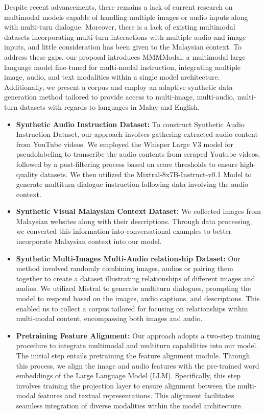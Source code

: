 \documentclass[preprint]{article}
\begin{document}
Despite recent advancements, there remains a lack of current research on multimodal models capable of handling multiple images or audio inputs along with multi-turn dialogue. Moreover, there is a lack of existing multimodal datasets incorporating multi-turn interactions with multiple audio and image inputs, and little consideration has been given to the Malaysian context. To address these gaps, our proposal introduces MMMModal, a multimodal large language model fine-tuned for multi-modal instruction, integrating multiple image, audio, and text modalities within a single model architecture. Additionally, we present a corpus and employ an adaptive synthetic data generation method tailored to provide access to multi-image, multi-audio, multi-turn datasets with regards to languages in Malay and English.

\begin{itemize}

  \item \textbf{Synthetic Audio Instruction Dataset:} To construct Synthetic Audio Instruction Dataset, our approach involves gathering extracted audio content from YouTube videos. We  employed the Whisper Large V3 model for pseudolabeling to transcribe the audio contents from scraped Youtube videos, followed by a post-filtering process based on score thresholds to ensure high-quality datasets. We then utilized the Mixtral-8x7B-Instruct-v0.1 Model to generate multiturn dialogue instruction-following data involving the audio context.

  \item \textbf{Synthetic Visual Malaysian Context Dataset:}  We collected images from Malaysian websites along with their descriptions. Through data processing, we converted this information into conversational examples to better incorporate Malaysian context into our model.

  \item \textbf{Synthetic Multi-Images Multi-Audio relationship Dataset:} Our method involved randomly combining images, audios or pairing them together to create a dataset illustrating relationships of different images and audios. We utilized Mistral to generate multiturn dialogues, prompting the model to respond based on the images, audio captions, and descriptions. This enabled us to collect a corpus tailored for focusing on relationships within multi-modal content, encompassing both images and audio.

  \item \textbf{Pretraining Feature Alignment:} Our approach adopts a two-step training procedure to integrate multimodal and multiturn capabilities into our model. The initial step entails pretraining the feature alignment module. Through this process, we align the image and audio features with the pre-trained word embeddings of the Large Language Model (LLM). Specifically, this step involves training the projection layer to ensure alignment between the multi-modal features and textual representations. This alignment facilitates seamless integration of diverse modalities within the model architecture.


\end{itemize}
\end{document}
